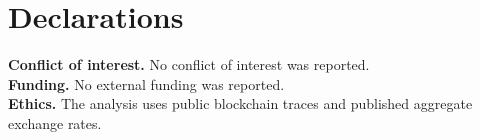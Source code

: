 \documentclass[sn-vancouver,Numbered]{sn-jnl}
\begin{document}
\section*{Declarations}
\textbf{Conflict of interest.} No conflict of interest was reported.\\
\textbf{Funding.} No external funding was reported.\\
\textbf{Ethics.} The analysis uses public blockchain traces and published aggregate exchange rates.

\begingroup
\renewcommand{\bibfont}{\small}
\setlength{\bibsep}{2pt}

\endgroup
\end{document}
